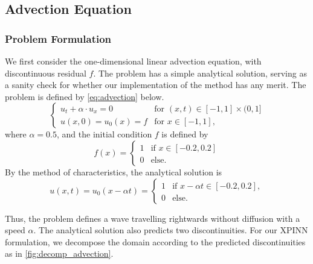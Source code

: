 \subsection{Advection Equation}\label{sec:advection}
\subsubsection{Problem Formulation}
We first consider the one-dimensional linear advection equation, with discontinuous residual $f$.
The problem has a simple analytical solution, serving as a sanity check for whether our implementation of the method has any merit.
The problem is defined by \eqref{eq:advection} below.
\begin{equation}
\begin{cases}
    u_t + \alpha \cdot u_x= 0 &\text{for } (x,t)\in [-1, 1] \times (0, 1] \\ 
    u(x, 0) = u_0(x)= f &\text{for } x \in [-1, 1],
\end{cases}
\label{eq:advection}
\end{equation}
where $\alpha = 0.5$, and the initial condition $f$ is defined by
\begin{equation*}
    f(x) =
    \begin{cases}
        1 &\text{if } x \in [-0.2, 0.2] \\
        0 &\text{else}.
    \end{cases}
\end{equation*}
By the method of characteristics, the analytical solution is
\begin{equation}
    u(x,t) = u_0(x-\alpha t) =
    \begin{cases}
        1 &\text{if } x - \alpha t \in  [-0.2, 0.2], \\
        0 &\text{else}.
    \end{cases}
\end{equation}

Thus, the problem defines a wave travelling rightwards without diffusion with a speed $\alpha$.
The analytical solution also predicts two discontinuities.
For our XPINN formulation, we decompose the domain according to the predicted discontinuities as in \autoref{fig:decomp_advection}.

